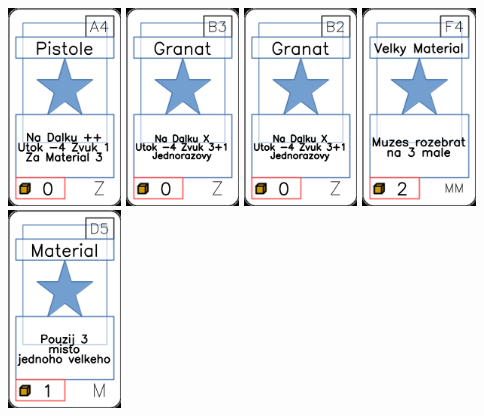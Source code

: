 \documentclass[a4paper]{article}
\begin{document}
	\includegraphics[width=3.0cm]{img-1_93}
	\includegraphics[width=3.0cm]{img-1_97}
	\includegraphics[width=3.0cm]{img-1_96}
	\includegraphics[width=3.0cm]{img-1_58}
	\includegraphics[width=3.0cm]{img-1_49}
\end{document}
